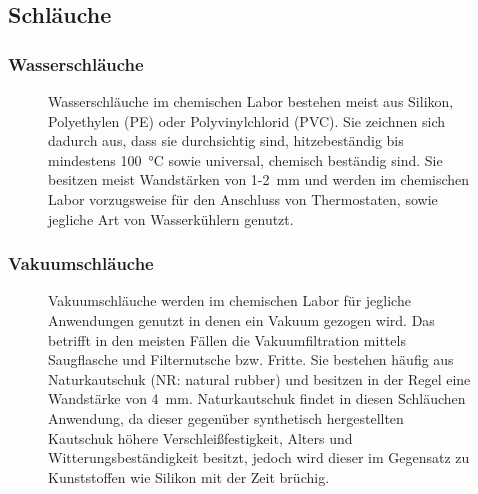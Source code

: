 \subsection{Schläuche}
\subsubsection*{Wasserschläuche}
\begin{figure}[h!]
	\begin{minipage}[t]{0.63\textwidth}
		\vspace{0pt}
		Wasserschläuche im chemischen Labor bestehen meist aus Silikon, Polyethylen (PE) oder Polyvinylchlorid (PVC). Sie zeichnen sich dadurch aus, dass sie durchsichtig sind, hitzebeständig bis mindestens \SI{100}{\celsius} sowie universal, chemisch beständig sind. 
		Sie besitzen meist Wandstärken von 1-\SI{2}{\milli \meter} und werden im chemischen Labor vorzugsweise für den Anschluss von Thermostaten, sowie jegliche Art von Wasserkühlern genutzt.
	\end{minipage}
	\hfill
	\hspace{1mm}
	\begin{minipage}[t]{0.35\textwidth}
	\end{minipage}
\end{figure}
\FloatBarrier
\vspace{-7mm}
\subsubsection*{Vakuumschläuche}
 \begin{figure}[h!]
	\begin{minipage}[t]{0.35\textwidth}
	\end{minipage}
	\hfill
	\hspace{2mm}
	\begin{minipage}[t]{0.65\textwidth}
		\vspace{0pt}
		Vakuumschläuche werden im chemischen Labor für jegliche Anwendungen genutzt in denen ein Vakuum gezogen wird. Das betrifft in den meisten Fällen die Vakuumfiltration mittels Saugflasche und Filternutsche bzw. Fritte. Sie bestehen häufig aus Naturkautschuk (NR: natural rubber) und besitzen in der Regel eine Wandstärke von \SI{4}{\milli \meter}. Naturkautschuk findet in diesen Schläuchen Anwendung, da dieser gegenüber synthetisch hergestellten Kautschuk höhere Verschleißfestigkeit, Alters und Witterungsbeständigkeit besitzt, jedoch wird dieser im Gegensatz zu Kunststoffen wie Silikon mit der Zeit brüchig.
	\end{minipage}
\end{figure}
\FloatBarrier

